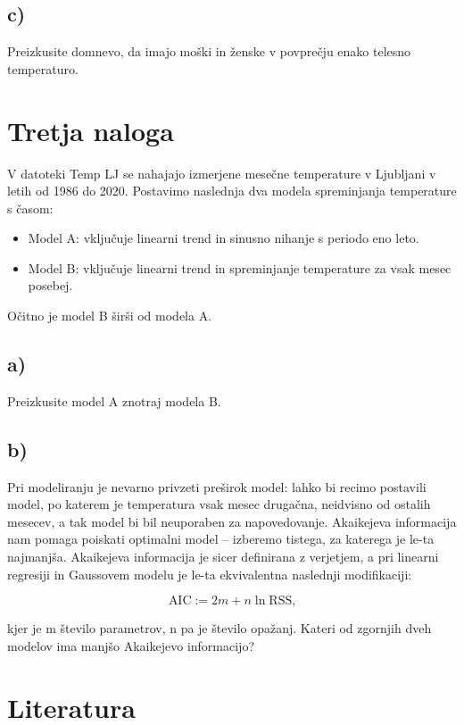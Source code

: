 \documentclass[12pt, a4paper]{article}
\begin{document}
\subsection{c)}
Preizkusite domnevo, da imajo moški in ženske v povprečju enako telesno 
temperaturo.



\section{Tretja naloga}

V datoteki Temp LJ se nahajajo izmerjene mesečne temperature v Ljubljani v 
letih od 1986 do 2020. Postavimo naslednja dva modela spreminjanja temperature
s časom: 

\begin{itemize}
     
    \item Model A: vključuje linearni trend in sinusno nihanje s periodo eno 
        leto.
    \item Model B: vključuje linearni trend in spreminjanje temperature za 
        vsak mesec posebej.

\end{itemize}

Očitno je model B širši od modela A.

\subsection{a)}

Preizkusite model A znotraj modela B.

\subsection{b)}
Pri modeliranju je nevarno privzeti preširok model: lahko bi recimo postavili
model, po katerem je temperatura vsak mesec drugačna, neidvisno od ostalih
mesecev, a tak model bi bil neuporaben za napovedovanje. Akaikejeva 
informacija nam pomaga poiskati optimalni model – izberemo tistega, za katerega
je le-ta najmanjša. Akaikejeva informacija je sicer definirana z verjetjem, 
a pri linearni regresiji in Gaussovem modelu je le-ta ekvivalentna naslednji 
modifikaciji:

\[
    \text{AIC} := 2m + n \ln \text{RSS,}
    \]

kjer je m število parametrov, n pa je število opažanj. Kateri od zgornjih dveh
modelov ima manjšo Akaikejevo informacijo?



\section{Literatura}
\end{document}

